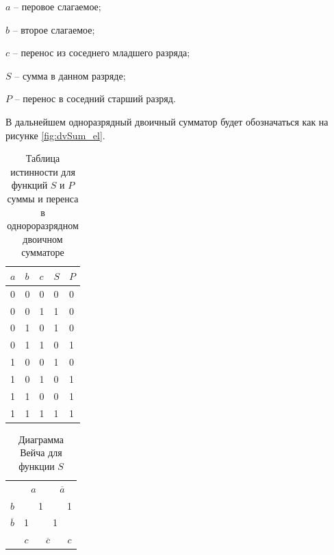 \documentclass[a4paper,14pt]{article}
\begin{document}
$a$ -- перовое слагаемое;

$b$ -- второе слагаемое;

$c$ -- перенос из соседнего младшего разряда;

$S$ -- сумма в данном разряде;

$P$ -- перенос в соседний старший разряд.

В дальнейшем одноразрядный двоичный сумматор будет обозначаться как на рисунке \ref{fig:dvSum_el}.

\begin{table}[H]
\begin{center}
	\caption{\label{tab:dvSum} Таблица истинности для функций $S$ и $P$ суммы и перенса в однороразрядном двоичном сумматоре}
	\begin{tabular}{|l|l|l|l|l|}
		\hline
		$a$ & $b$ & $c$ & $S$ & $P$ \\ \hline
		0 & 0 & 0 & 0 & 0 \\ \hline
		0 & 0 & 1 & 1 & 0 \\ \hline
		0 & 1 & 0 & 1 & 0 \\ \hline
		0 & 1 & 1 & 0 & 1 \\ \hline
		1 & 0 & 0 & 1 & 0 \\ \hline
		1 & 0 & 1 & 0 & 1 \\ \hline
		1 & 1 & 0 & 0 & 1 \\ \hline
		1 & 1 & 1 & 1 & 1 \\ \hline
	\end{tabular}
\end{center}
\end{table}

\begin{table}[H]
	\begin{center}
		\caption{\label{tab:SDvSum} Диаграмма Вейча для функции $S$}
	\begin{tabular}{ccccc}
		& \multicolumn{2}{c}{$a$}                           & \multicolumn{2}{c}{$\overline{a}$}                          \\ \cline{2-5} 
		\multicolumn{1}{c|}{$b$}  & \multicolumn{1}{c|}{}  & \multicolumn{1}{c|}{1} & \multicolumn{1}{c|}{}  & \multicolumn{1}{c|}{1} \\ \cline{2-5} 
		\multicolumn{1}{c|}{$\overline{b}$} & \multicolumn{1}{c|}{1} & \multicolumn{1}{c|}{}  & \multicolumn{1}{c|}{1} & \multicolumn{1}{c|}{}  \\ \cline{2-5} 
		& $c$                     & \multicolumn{2}{c}{$\overline{c}$}                          & $c$                     
	\end{tabular}
\end{center}
\end{table}
\end{document}
